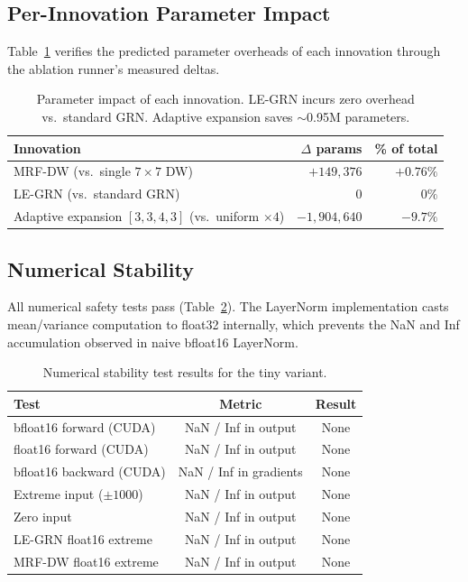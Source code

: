 \documentclass{article}
\begin{document}
\subsection{Per-Innovation Parameter Impact}

Table~\ref{tab:innovation_overhead} verifies the predicted parameter
overheads of each innovation through the ablation runner's measured
deltas.

\begin{table}[h]
  \centering
  \caption{Parameter impact of each innovation.  LE-GRN incurs zero
           overhead vs.\ standard GRN.  Adaptive expansion saves
           $\sim$0.95M parameters.}
  \label{tab:innovation_overhead}
  \begin{tabular}{lrr}
  \toprule
  Innovation & $\Delta$ params & \% of total \\
  \midrule
  MRF-DW (vs.\ single $7\times7$ DW) & $+149,376$ & $+0.76\%$ \\
  LE-GRN (vs.\ standard GRN) & $0$ & $0\%$ \\
  Adaptive expansion $[3,3,4,3]$ (vs.\ uniform $\times4$) & $-1,904,640$ & $-9.7\%$ \\
  \bottomrule
  \end{tabular}
\end{table}

\subsection{Numerical Stability}

All numerical safety tests pass (Table~\ref{tab:numerics}).  The
LayerNorm implementation casts mean/variance computation to float32
internally, which prevents the NaN and Inf accumulation observed in
naive bfloat16 LayerNorm.

\begin{table}[h]
  \centering
  \caption{Numerical stability test results for the tiny variant.}
  \label{tab:numerics}
  \begin{tabular}{lcc}
  \toprule
  Test & Metric & Result \\
  \midrule
  bfloat16 forward (CUDA) & NaN / Inf in output & None \\
  float16 forward (CUDA)  & NaN / Inf in output & None \\
  bfloat16 backward (CUDA) & NaN / Inf in gradients & None \\
  Extreme input ($\pm1000$) & NaN / Inf in output & None \\
  Zero input & NaN / Inf in output & None \\
  LE-GRN float16 extreme & NaN / Inf in output & None \\
  MRF-DW float16 extreme & NaN / Inf in output & None \\
  \bottomrule
  \end{tabular}
\end{table}
\end{document}
